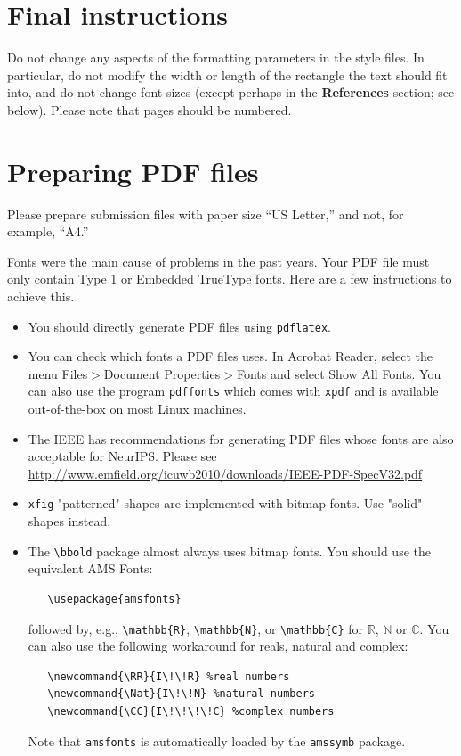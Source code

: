 \documentclass{article}
\begin{document}
\section{Final instructions}


Do not change any aspects of the formatting parameters in the style files.  In
particular, do not modify the width or length of the rectangle the text should
fit into, and do not change font sizes (except perhaps in the
\textbf{References} section; see below). Please note that pages should be
numbered.


\section{Preparing PDF files}


Please prepare submission files with paper size ``US Letter,'' and not, for
example, ``A4.''


Fonts were the main cause of problems in the past years. Your PDF file must only
contain Type 1 or Embedded TrueType fonts. Here are a few instructions to
achieve this.


\begin{itemize}


\item You should directly generate PDF files using \verb+pdflatex+.


\item You can check which fonts a PDF files uses.  In Acrobat Reader, select the
  menu Files$>$Document Properties$>$Fonts and select Show All Fonts. You can
  also use the program \verb+pdffonts+ which comes with \verb+xpdf+ and is
  available out-of-the-box on most Linux machines.


\item The IEEE has recommendations for generating PDF files whose fonts are also
  acceptable for NeurIPS. Please see
  \url{http://www.emfield.org/icuwb2010/downloads/IEEE-PDF-SpecV32.pdf}


\item \verb+xfig+ "patterned" shapes are implemented with bitmap fonts.  Use
  "solid" shapes instead.


\item The \verb+\bbold+ package almost always uses bitmap fonts.  You should use
  the equivalent AMS Fonts:
\begin{verbatim}
   \usepackage{amsfonts}
\end{verbatim}
followed by, e.g., \verb+\mathbb{R}+, \verb+\mathbb{N}+, or \verb+\mathbb{C}+
for $\mathbb{R}$, $\mathbb{N}$ or $\mathbb{C}$.  You can also use the following
workaround for reals, natural and complex:
\begin{verbatim}
   \newcommand{\RR}{I\!\!R} %real numbers
   \newcommand{\Nat}{I\!\!N} %natural numbers
   \newcommand{\CC}{I\!\!\!\!C} %complex numbers
\end{verbatim}
Note that \verb+amsfonts+ is automatically loaded by the \verb+amssymb+ package.


\end{itemize}
\end{document}
